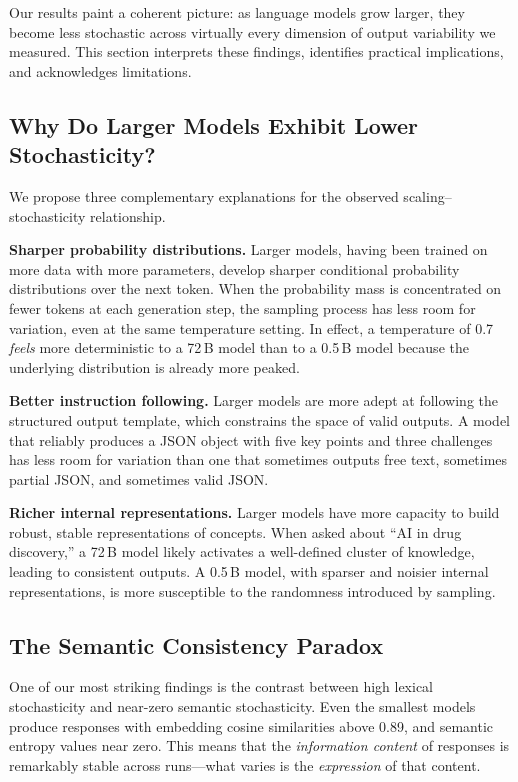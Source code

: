 \documentclass[11pt,a4paper]{article}
\begin{document}
Our results paint a coherent picture: as language models grow larger, they become less stochastic across virtually every dimension of output variability we measured.
This section interprets these findings, identifies practical implications, and acknowledges limitations.

\subsection{Why Do Larger Models Exhibit Lower Stochasticity?}

We propose three complementary explanations for the observed scaling--stochasticity relationship.

\textbf{Sharper probability distributions.}
Larger models, having been trained on more data with more parameters, develop sharper conditional probability distributions over the next token.
When the probability mass is concentrated on fewer tokens at each generation step, the sampling process has less room for variation, even at the same temperature setting.
In effect, a temperature of 0.7 \emph{feels} more deterministic to a 72\,B model than to a 0.5\,B model because the underlying distribution is already more peaked.

\textbf{Better instruction following.}
Larger models are more adept at following the structured output template, which constrains the space of valid outputs.
A model that reliably produces a JSON object with five key points and three challenges has less room for variation than one that sometimes outputs free text, sometimes partial JSON, and sometimes valid JSON.

\textbf{Richer internal representations.}
Larger models have more capacity to build robust, stable representations of concepts.
When asked about ``AI in drug discovery,'' a 72\,B model likely activates a well-defined cluster of knowledge, leading to consistent outputs.
A 0.5\,B model, with sparser and noisier internal representations, is more susceptible to the randomness introduced by sampling.

\subsection{The Semantic Consistency Paradox}

One of our most striking findings is the contrast between high lexical stochasticity and near-zero semantic stochasticity.
Even the smallest models produce responses with embedding cosine similarities above 0.89, and semantic entropy values near zero.
This means that the \emph{information content} of responses is remarkably stable across runs---what varies is the \emph{expression} of that content.
\end{document}
